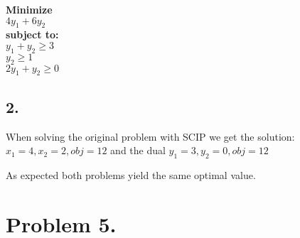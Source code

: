 \documentclass[12pt]{report}
\begin{document}
\textbf{Minimize}\\
  $ 4y_1 + 6y_2 $\\
\textbf{subject to:}\\
  $ y_1 + y_2  \ge 3 $ \\
  $ y_2        \ge 1 $ \\
  $ 2y_1 + y_2 \ge 0 $ 

\subsection*{2.}

When solving the original problem with SCIP we get the solution:
$ x_1 = 4, x_2 = 2, obj = 12$
and the dual
$ y_1 = 3, y_2 = 0, obj = 12$

As expected both problems yield the same optimal value.



\section*{Problem 5.}
\end{document}
